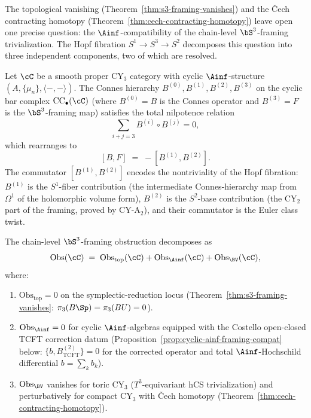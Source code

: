 The topological vanishing (Theorem~\ref{thm:s3-framing-vanishes}) and the \v{C}ech contracting homotopy (Theorem~\ref{thm:cech-contracting-homotopy}) leave open one precise question: the $\Ainf$-compatibility of the chain-level $\bS^3$-framing trivialization. The Hopf fibration $S^1 \to S^3 \to S^2$ decomposes this question into three independent components, two of which are resolved.

\begin{proposition}
\label{prop:hopf-fibration-decomposition}
Let $\cC$ be a smooth proper CY$_3$ category with cyclic $\Ainf$-structure $(A, \{\mu_n\}, \langle -,- \rangle)$. The Connes hierarchy $B^{(0)}, B^{(1)}, B^{(2)}, B^{(3)}$ on the cyclic bar complex $\mathrm{CC}_\bullet(\cC)$ \textup{(}where $B^{(0)} = B$ is the Connes operator and $B^{(3)} = F$ is the $\bS^3$-framing map\textup{)} satisfies the total nilpotence relation
\[
 \sum_{i+j=3} B^{(i)} \circ B^{(j)} = 0,
\]
which rearranges to
\[
 [B, F] \;=\; -[B^{(1)}, B^{(2)}].
\]
The commutator $[B^{(1)}, B^{(2)}]$ encodes the nontriviality of the Hopf fibration: $B^{(1)}$ is the $S^1$-fiber contribution \textup{(}the intermediate Connes-hierarchy map from $\Omega^1$ of the holomorphic volume form\textup{)}, $B^{(2)}$ is the $S^2$-base contribution \textup{(}the CY$_2$ part of the framing, proved by CY-A$_2$\textup{)}, and their commutator is the Euler class twist.

The chain-level $\bS^3$-framing obstruction decomposes as
\[
 \mathrm{Obs}(\cC) \;=\; \mathrm{Obs}_{\mathrm{top}}(\cC) + \mathrm{Obs}_{\Ainf}(\cC) + \mathrm{Obs}_{\BV}(\cC),
\]
where:
\begin{enumerate}[label=\textup{(\alph*)}]
 \item $\mathrm{Obs}_{\mathrm{top}} = 0$ on the symplectic-reduction locus \textup{(}Theorem~\textup{\ref{thm:s3-framing-vanishes}}: $\pi_3(B\Sp) = \pi_3(BU) = 0$\textup{)}.
 \item $\mathrm{Obs}_{\Ainf} = 0$ for cyclic $\Ainf$-algebras equipped
 with the Costello open-closed TCFT correction datum
 \textup{(}Proposition~\textup{\ref{prop:cyclic-ainf-framing-compat}} below:
 $\{b, B^{(2)}_{\mathrm{TCFT}}\} = 0$ for the corrected operator and
 total $\Ainf$-Hochschild differential $b = \sum_k b_k$\textup{)}.
 \item $\mathrm{Obs}_{\BV}$ vanishes for toric CY$_3$ \textup{(}$T^3$-equivariant hCS trivialization\textup{)} and perturbatively for compact CY$_3$ with \v{C}ech homotopy \textup{(}Theorem~\textup{\ref{thm:cech-contracting-homotopy}}\textup{)}.
\end{enumerate}
\end{proposition}

